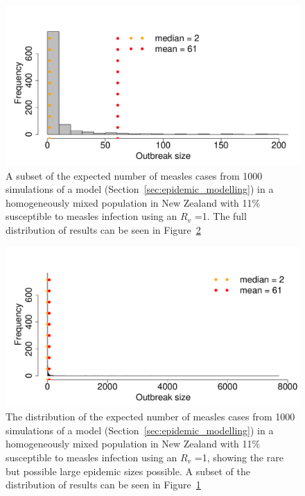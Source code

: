 \documentclass{article}
\begin{document}
\begin{figure}
     \centering
\includegraphics{draftfinalreport-063}
     \caption{A subset of the expected number of measles cases from 1000 simulations of a model (Section~\ref{sec:epidemic_modelling}) in a homogeneously mixed population in New Zealand with 11\% susceptible to measles infection using an $R_v$ =1. The full distribution of results can be seen in Figure~\ref{fig:sim1}}
     \label{fig:sim}
\end{figure}

\begin{figure}
     \centering
\includegraphics{draftfinalreport-064}
     \caption{The distribution of the expected number of measles cases from 1000 simulations of a model (Section~\ref{sec:epidemic_modelling}) in a homogeneously mixed population in New Zealand with 11\% susceptible to measles infection using an $R_v$ =1, showing the rare but possible large epidemic sizes possible. A subset of the distribution of results can be seen in Figure~\ref{fig:sim}}
     \label{fig:sim1}
\end{figure}
\end{document}
